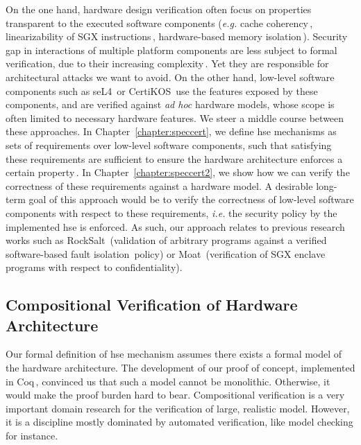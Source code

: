 On the one hand, hardware design verification often focus on properties
transparent to the executed software components (\emph{e.g.} cache
coherency\,\cite{stern1995cachecoherence}, linearizability of SGX
instructions\,\cite{leslie2015sgx}, hardware-based memory
isolation\,\cite{lie2003xom}).
%
Security gap in interactions of multiple platform components are less subject to
formal verification, due to their increasing
complexity\,\cite{potlapally2011hardwaresecurity}.
%
Yet they are responsible for architectural attacks we want to avoid.
%
On the other hand, low-level software components such as
seL4\,\cite{klein2009sel4} or CertiKOS\,\cite{gu2016certikos} use the features
exposed by these components, and are verified against \emph{ad hoc} hardware
models, whose scope is often limited to necessary hardware features.
%
We steer a middle course between these approaches.
%
In Chapter~\ref{chapter:speccert}, we define \ac{hse} mechanisms as sets of
requirements over low-level software components, such that satisfying these
requirements are sufficient to ensure the hardware architecture enforces a
certain property\,\cite{letan2016speccert}.
%
In Chapter~\ref{chapter:speccert2}, we show how we can verify the correctness of
these requirements against a hardware model.
%
A desirable long-term goal of this approach would be to verify the correctness
of low-level software components with respect to these requirements, \emph{i.e.}
the security policy by the implemented \ac{hse} is enforced.
%
As such, our approach relates to previous research works such as
RockSalt\,\cite{morrisett2012rocksalt} (validation of arbitrary programs against
a verified software-based fault isolation\,\cite{wahbe1994sfi} policy) or
Moat\,\cite{sinha2015moat} (verification of SGX
enclave\,\cite{costan2016sgxexplained} programs with respect to
confidentiality).

\subsection{Compositional Verification of Hardware Architecture}

Our formal definition of \ac{hse} mechanism assumes there exists a formal model
of the hardware architecture.
%
The development of our proof of concept, implemented in
Coq\,\cite{letan2016speccertcode}, convinced us that such a model cannot be
monolithic.
%
Otherwise, it would make the proof burden hard to bear.
%
Compositional verification is a very important domain research for the
verification of large, realistic model.
%
However, it is a discipline mostly dominated by automated verification, like
model checking for instance.

